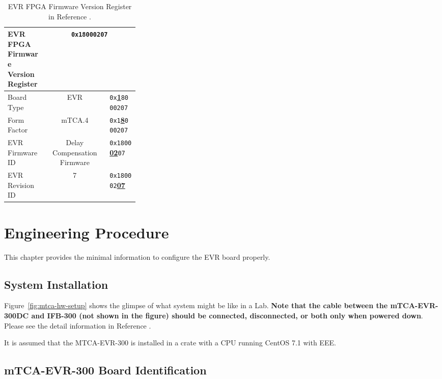 \documentclass[11pt
  , a4paper
  , article
  , oneside
  , showtrims
]{memoir}
\begin{document}
\begin{table}[!htb]
  \centering
  \begin{tabular}{p{0.3\linewidth}|c|l}
    \toprule
    EVR FPGA Firmware Version Register            & \multicolumn{2}{c}{\texttt{0x18000207}}             \\\midrule
    Board Type      & EVR                         &  \texttt{0x}\underline{\textbf{1}}\texttt{8000207}  \\\midrule
    Form Factor     & mTCA.4                      &  \texttt{0x1}\underline{\textbf{8}}\texttt{000207}  \\\midrule
    EVR Firmware ID & Delay Compensation Firmware &  \texttt{0x1800}\underline{\textbf{02}}\texttt{07}  \\\midrule
    EVR Revision ID & 7                           &  \texttt{0x180002}\underline{\textbf{07}}           \\\bottomrule
  \end{tabular}
  \caption[]{EVR FPGA Firmware Version Register in Reference \citep[see][p66]{MRFEVENTSYSTEMDC}.}
  \label{table:fwinfo}
\end{table}


\clearpage
\chapter{Engineering Procedure}
This chapter provides the minimal information to configure the EVR board properly. 

\section{System Installation} 
Figure~\ref{fig:mtca-hw-setup} shows the glimpse of what system might be like in a Lab. \textbf{Note that the cable between the mTCA-EVR-300DC and IFB-300 (not shown in the figure) should be connected, disconnected, or both only when powered down}. Please see the detail information in Reference \citep[][p54]{MRFEVENTSYSTEMDC}.

It is assumed that the MTCA-EVR-300 is installed in a crate with a CPU running CentOS 7.1 with EEE.
  
\section{mTCA-EVR-300 Board Identification}
\end{document}
